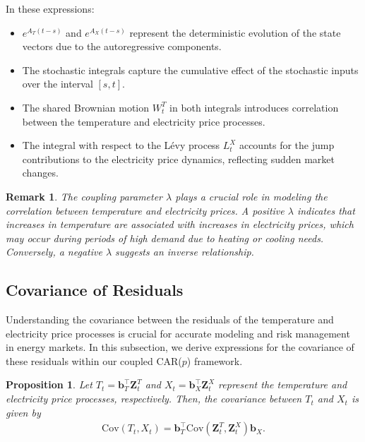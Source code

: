 \documentclass[10pt,a4paper,reqno]{amsart}
\newtheorem{remark}[theorem]{Remark}
\newtheorem{proposition}[theorem]{Proposition}
\theoremstyle{example}
\newcommand{\Cov}{\mathrm{Cov}}
\begin{document}
In these expressions:

\begin{itemize}
    \item $e^{A_T (t - s)}$ and $e^{A_X (t - s)}$ represent the deterministic evolution of the state vectors due to the autoregressive components.
    \item The stochastic integrals capture the cumulative effect of the stochastic inputs over the interval $[s, t]$.
    \item The shared Brownian motion $W_t^T$ in both integrals introduces correlation between the temperature and electricity price processes.
    \item The integral with respect to the L\'evy process $L_t^X$ accounts for the jump contributions to the electricity price dynamics, reflecting sudden market changes.
\end{itemize}

\begin{remark}
The coupling parameter $\lambda$ plays a crucial role in modeling the
correlation between temperature and electricity prices. A positive $\lambda$
indicates that increases in temperature are associated with increases in
electricity prices, which may occur during periods of high demand due to heating
or cooling needs. Conversely, a negative $\lambda$ suggests an inverse
relationship.   
\end{remark}

\subsection{Covariance of Residuals}

Understanding the covariance between the residuals of the temperature and electricity price processes is crucial for accurate modeling and risk management in energy markets. In this subsection, we derive expressions for the covariance of these residuals within our coupled CAR($p$) framework.

\begin{proposition}
Let $T_t = \mathbf{b}_T^\top \mathbf{Z}_t^T$ and $X_t = \mathbf{b}_X^\top \mathbf{Z}_t^X$ represent the temperature and electricity price processes, respectively. Then, the covariance between $T_t$ and $X_t$ is given by
\begin{align}
\Cov(T_t, X_t) = \mathbf{b}_T^\top \Cov\left( \mathbf{Z}_t^T, \mathbf{Z}_t^X \right) \mathbf{b}_X. \label{eq:covariance_T_X}
\end{align}
\end{proposition}
\end{document}
